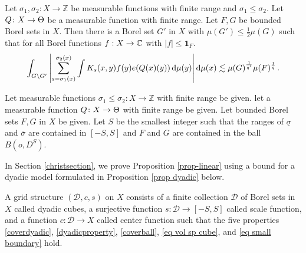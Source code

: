 \begin{prop}\label{prop-linear}
Let ${\sigma_1},\sigma_2\colon X\to \mathbb{Z}$ be measurable functions with finite range and ${\sigma_1}\leq  \sigma_2$. Let ${Q}\colon X\to \Theta$ be a measurable function with finite range. Let $F,G$ be bounded Borel sets in $X$. Then there is a Borel set $G'$ in $X$ with $\mu(G')\leq \frac 12 \mu(G)$ such that
for all Borel functions $f:X\to \mathbb{C}$ with $|f|\le \mathbf{1}_F$.
\begin{multline}\label{eq-linearized}
\int_{G \setminus G'} \left|\sum_{s={\sigma_1}(x)}^{{\sigma_2}(x)} \int K_s(x,y) f(y) e({Q}(x)(y))  \, \mathrm{d}\mu(y) \right| \mathrm{d}\mu(x)  \lesssim \mu(G)^{\frac 1{q'}}
    \mu(F)^{\frac 1 q}\,.
\end{multline}
\end{prop}
Let measurable functions ${\sigma_1}\leq \sigma_2\colon X\to \mathbb{Z}$ with finite range be given. let a measurable function
${Q}\colon X\to \Theta$ with finite range
be given.
Let bounded Borel sets $F,G$ in $X$ be given.
Let $S$ be the smallest integer such that the ranges of
$\underline{\sigma}$ and $ \overline\sigma$ are contained in $[-S,S]$ and $F$ and $G$ are contained
in the ball $B(o, D^S)$.


In Section \ref{christsection},
we prove Proposition \ref{prop-linear}
    using  a
bound for a dyadic model formulated in Proposition
\ref{prop dyadic} below.


A grid structure $(\mathcal{D}, c, s)$ on $X$ consists of a finite collection $\mathcal{D}$  of Borel sets in $X$ called dyadic cubes, a surjective function  $s\colon \mathcal{D}\to [-S, S]$
called scale function,
and a function $c:\mathcal{D}\to X$
called center function such that the five properties
\eqref{coverdyadic},
\eqref{dyadicproperty}, \eqref{coverball},
\eqref{eq vol sp cube}, and \eqref{eq small boundary}
hold.

